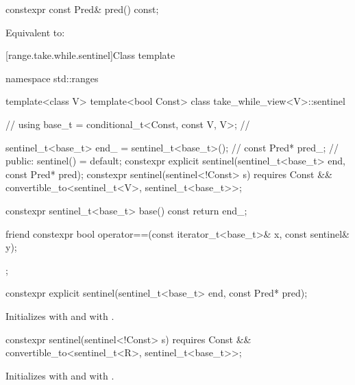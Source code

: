%
\begin{itemdecl}
constexpr const Pred& pred() const;
\end{itemdecl}

\begin{itemdescr}
\pnum
\effects
Equivalent to: 
\end{itemdescr}

[range.take.while.sentinel]{Class template }

%
\begin{codeblock}
namespace std::ranges {
  template<class V>
  template<bool Const>
  class take_while_view<V>::sentinel {                  // \expos
    using base_t = conditional_t<Const, const V, V>;    // \expos

    sentinel_t<base_t> end_ = sentinel_t<base_t>();     // \expos
    const Pred* pred_{};                                // \expos
  public:
    sentinel() = default;
    constexpr explicit sentinel(sentinel_t<base_t> end, const Pred* pred);
    constexpr sentinel(sentinel<!Const> s)
      requires Const && convertible_to<sentinel_t<V>, sentinel_t<base_t>>;

    constexpr sentinel_t<base_t> base() const { return end_; }

    friend constexpr bool operator==(const iterator_t<base_t>& x, const sentinel& y);
  };
}
\end{codeblock}

%
\begin{itemdecl}
constexpr explicit sentinel(sentinel_t<base_t> end, const Pred* pred);
\end{itemdecl}

\begin{itemdescr}
\pnum
\effects
Initializes  with  and  with .
\end{itemdescr}

%
\begin{itemdecl}
constexpr sentinel(sentinel<!Const> s)
  requires Const && convertible_to<sentinel_t<R>, sentinel_t<base_t>>;
\end{itemdecl}

\begin{itemdescr}
\pnum
\effects
Initializes  with  and
 with .
\end{itemdescr}


